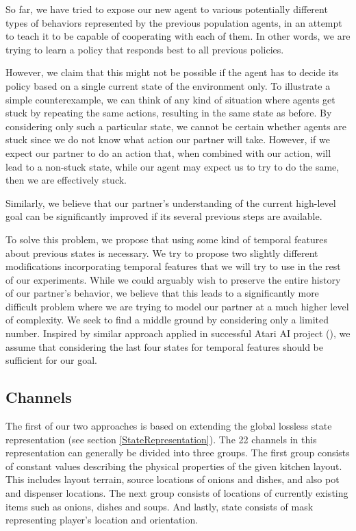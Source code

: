 So far, we have tried to expose our new agent to various potentially different types of behaviors represented by the previous population agents, in an attempt to teach it to be capable of cooperating with each of them.
In other words, we are trying to learn a policy that responds best to all previous policies.

However, we claim that this might not be possible if the agent has to decide its policy based on a single current state of the environment only.
To illustrate a simple counterexample, we can think of any kind of situation where agents get stuck by repeating the same actions, resulting in the same state as before.
By considering only such a particular state, we cannot be certain whether agents are stuck since we do not know what action our partner will take.
However, if we expect our partner to do an action that, when combined with our action, will lead to a non-stuck state, while our agent may expect us to try to do the same, then we are effectively stuck.

Similarly, we believe that our partner's understanding of the current high-level goal can be significantly improved if its several previous steps are available.

To solve this problem, we propose that using some kind of temporal features about previous states is necessary.
We try to propose two slightly different modifications incorporating temporal features that we will try to use in the rest of our experiments.
While we could arguably wish to preserve the entire history of our partner's behavior, we believe that this leads to a significantly more difficult problem where we are trying to model our partner at a much higher level of complexity.
We seek to find a middle ground by considering only a limited number.
Inspired by similar approach applied in successful Atari AI project (\cite{Atari}), we assume that considering the last four states for temporal features should be sufficient for our goal.


\subsection{Channels}
The first of our two approaches is based on extending the global lossless state representation (see section \ref{StateRepresentation}).
The 22 channels in this representation can generally be divided into three groups.
The first group consists of constant values describing the physical properties of the given kitchen layout. 
This includes layout terrain, source locations of onions and dishes, and also pot and dispenser locations.
The next group consists of locations of currently existing items such as onions, dishes and soups.
And lastly, state consists of mask representing player's location and orientation.

